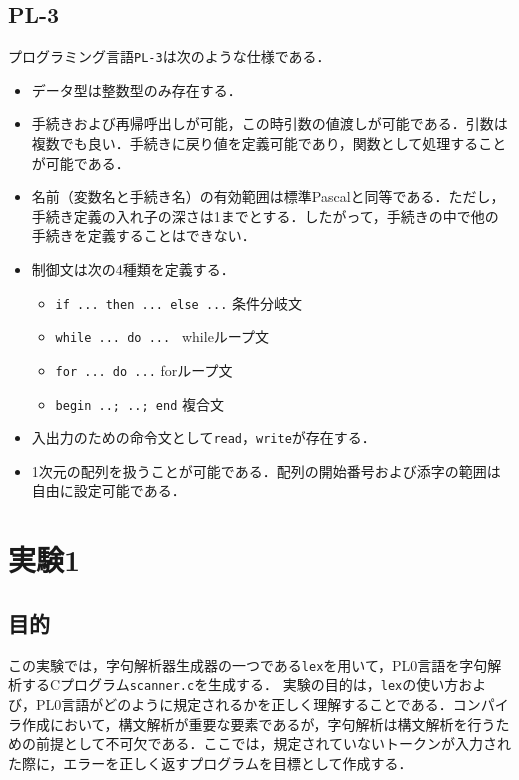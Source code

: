 \documentclass[uplatex]{jsarticle}
\begin{document}
\subsection{PL-3}
プログラミング言語\verb#PL-3#は次のような仕様である．
\begin{itemize}
  \item データ型は整数型のみ存在する．
  \item 手続きおよび再帰呼出しが可能，この時引数の値渡しが可能である．引数は複数でも良い．手続きに戻り値を定義可能であり，関数として処理することが可能である．
  \item 名前（変数名と手続き名）の有効範囲は標準Pascalと同等である．ただし，手続き定義の入れ子の深さは1までとする．したがって，手続きの中で他の手続きを定義することはできない．
  \item 制御文は次の4種類を定義する．
  \begin{itemize}
    \item \verb#if ... then ... else ...# 条件分岐文
    \item \verb#while ... do ... # whileループ文
    \item \verb#for ... do ...# forループ文
    \item \verb#begin ..; ..; end# 複合文
  \end{itemize}
  \item 入出力のための命令文として\verb#read#，\verb#write#が存在する．
  \item 1次元の配列を扱うことが可能である．配列の開始番号および添字の範囲は自由に設定可能である．
\end{itemize}
\section{実験1}
\subsection{目的}
この実験では，字句解析器生成器の一つである\verb#lex#を用いて，PL0言語を字句解析するCプログラム\verb#scanner.c#を生成する．
実験の目的は，\verb#lex#の使い方および，PL0言語がどのように規定されるかを正しく理解することである．コンパイラ作成において，構文解析が重要な要素であるが，字句解析は構文解析を行うための前提として不可欠である．ここでは，規定されていないトークンが入力された際に，エラーを正しく返すプログラムを目標として作成する．
\end{document}
